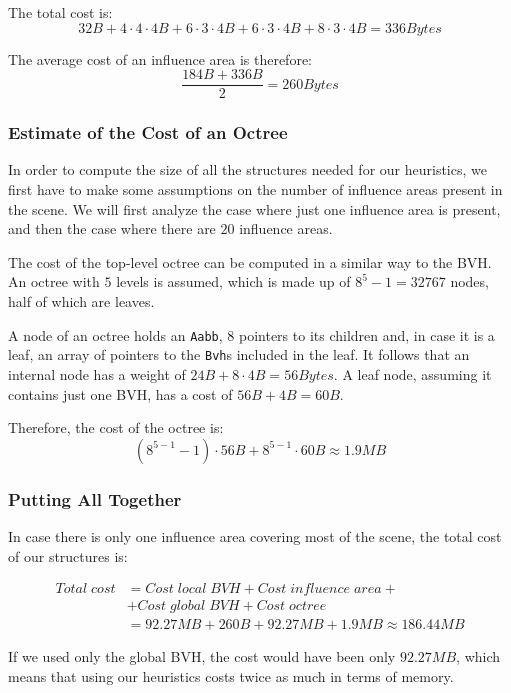 \documentclass[acmtog, anonymous, review]{acmart}
\begin{document}
The total cost is:
$$
32B + 4\cdot 4 \cdot 4B + 6 \cdot 3 \cdot 4B + 6 \cdot 3 \cdot 4B + 8 \cdot 3 \cdot 4B = 336 Bytes
$$

The average cost of an influence area is therefore: 
$$
\frac{184B + 336B}{2} = 260 Bytes
$$

\subsubsection{Estimate of the Cost of an Octree}
In order to compute the size of all the structures needed for our heuristics, we first have to make some assumptions on the number of influence areas present in the scene. We will first analyze the case where just one influence area is present, and then the case where there are $20$ influence areas.

The cost of the top-level octree can be computed in a similar way to the BVH. An octree with $5$ levels is assumed, which is made up of $8^{5}-1 = 32767$ nodes, half of which are leaves.

A node of an octree holds an \texttt{Aabb}, $8$ pointers to its children and, in case it is a leaf, an array of pointers to the \texttt{Bvh}s included in the leaf. It follows that an internal node has a weight of $24B + 8 \cdot 4B = 56 Bytes$. A leaf node, assuming it contains just one BVH, has a cost of $56B + 4B = 60B$.

Therefore, the cost of the octree is: 
$$
(8^{5-1}-1) \cdot 56B + 8^{5-1} \cdot 60B \approx 1.9MB
$$

\subsubsection{Putting All Together}
In case there is only one influence area covering most of the scene, the total cost of our structures is:

\begin{subequations}
	\begin{align*}
	Total\;cost &= Cost\;local\;BVH + Cost\;influence\;area +\\ &+ Cost\;global\;BVH + Cost\;octree\\
	&= 92.27MB + 260B + 92.27MB + 1.9MB \approx 186.44MB
	\end{align*}
\end{subequations}

If we used only the global BVH, the cost would have been only $92.27MB$, which means that using our heuristics costs twice as much in terms of memory.
\end{document}
